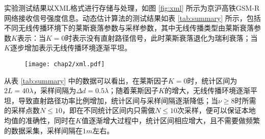 \begin{figure}[!htp]
\centering
{}
    \hspace{1cm}
\end{figure}

实验测试结果以XML格式进行存储与处理，如图 \ref{fig:xml} 所示为京沪高铁GSM-R网络接收信号强度信息。动态估计算法的测试结果如表 \ref{tab:summary} 所示，包括不同无线传播环境下的莱斯衰落参数与采样参数，其中无线传播类型由莱斯衰落参数$K$表示：当$K=0$时表示没有直射路径信号，此时莱斯衰落退化为瑞利衰落；当$K$逐步增加表示无线传播环境逐渐平坦。

\begin{figure}[!htp]
\centering
\texttt{[image: chap2/xml.pdf]}
\end{figure}

从表 \ref{tab:summary} 中的数据可以看出，在莱斯因子$K = 0$时，统计区间为$2L = 40\lambda$，采样间隔为$\Delta d = 0.5\lambda$；随着莱斯因子$K$的增大，无线传播环境逐渐平坦，导致直射路径功率比例增加，统计区间与采样间隔逐渐降低；当$\nu \geq 8$时所需的采样点数$N \leq 10$，即在不同统计区间内只需做$N \leq 10$次采样，便可以保证本地均值的准确性，同时在$K$值逐渐增大过程中，统计区间相应增大，且不需要做频繁的数据采集，采样间隔在$1m$左右。

